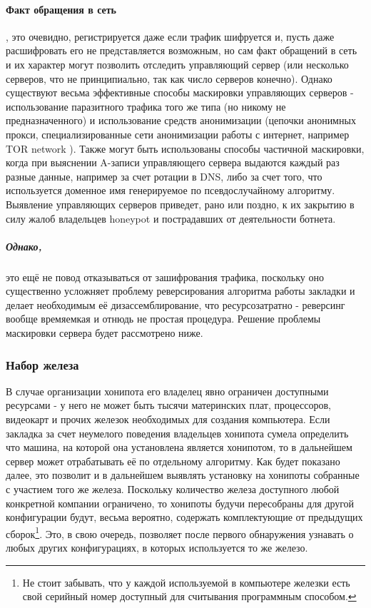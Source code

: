 \paragraph{Факт обращения в сеть},
это очевидно, регистрируется даже если трафик шифруется и, пусть даже
расшифровать его не представляется возможным, но  сам факт обращений в
сеть и их характер могут позволить отследить управляющий сервер (или несколько
серверов, что не принципиально, так как число серверов конечно). Однако
существуют весьма эффективные способы маскировки управляющих серверов -
использование паразитного трафика того же типа (но никому не
предназначенного) и использование средств анонимизации (цепочки анонимных
прокси, специализированные сети анонимизации работы с интернет, например
 TOR network ). Также могут быть
использованы способы частичной маскировки, когда при выяснении A-записи
 управляющего сервера выдаются каждый раз разные данные, например за счет
ротации в DNS, либо за счет того, что используется доменное имя
генерируемое по псевдослучайному алгоритму.
Выявление управляющих серверов приведет, рано или поздно, к их закрытию
в силу жалоб владельцев honeypot и пострадавших от деятельности ботнета.

\subparagraph{Однако,}

это ещё не повод отказываться от зашифрования трафика, поскольку оно
существенно усложняет проблему реверсирования алгоритма  работы закладки
и делает необходимым  её дизассемблирование, что
ресурсозатратно - реверсинг вообще времяемкая и отнюдь не
простая процедура. Решение проблемы маскировки сервера будет
рассмотрено ниже.

\subsubsection{Набор железа}

В случае организации  хонипота его владелец явно ограничен доступными
ресурсами - у него не может быть тысячи  материнских плат, процессоров,
видеокарт и прочих железок необходимых для создания компьютера.  Если
закладка за счет неумелого поведения владельцев хонипота сумела
определить что машина, на  которой она установлена является хонипотом,
то в дальнейшем сервер может отрабатывать её по отдельному алгоритму.
Как будет показано далее, это позволит и в дальнейшем выявлять установку
на хонипоты собранные с участием того же железа. Поскольку количество
железа доступного любой конкретной компании ограничено, то хонипоты
будучи пересобраны для другой конфигурации будут, весьма вероятно,
содержать комплектующие от предыдущих сборок\footnote{Не стоит забывать, что у каждой
используемой в компьютере железки есть свой серийный номер доступный для
считывания программным способом.}. Это, в свою очередь, позволяет после
первого обнаружения узнавать о любых других конфигурациях, в которых
используется то же железо.

